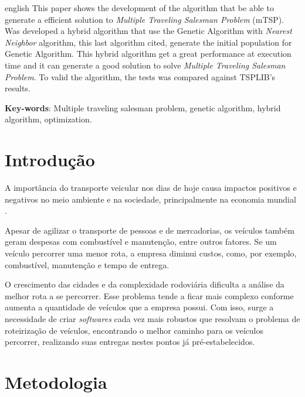 \documentclass[12pt,openright,a4paper,twoside]{tcc}
\begin{document}
	\begin{resumo}[Abstract]
    	\begin{otherlanguage*}{english}
		This paper shows the development of the algorithm that be able to generate a efficient solution to \textit{Multiple Traveling Salesman Problem} (mTSP). Was developed a hybrid algorithm that use the Genetic Algorithm with \textit{Nearest Neighbor} algorithm, this last algorithm cited, generate the initial population for Genetic Algorithm. This hybrid algorithm get a great performance at execution time and it can generate a good solution to solve \textit{Multiple Traveling Salesman Problem}. To valid the algorithm, the tests was compared against TSPLIB's results.

        \vspace{\onelineskip}
        \noindent
        \textbf{Key-words}: Multiple traveling salesman problem, genetic algorithm,  hybrid algorithm, optimization.
		\end{otherlanguage*}
	\end{resumo}
	

	\chapter{Introdução}
		
		A importância do transporte veicular nos dias de hoje causa impactos positivos e negativos 
	    no meio ambiente e na sociedade, principalmente na economia mundial \cite{meioAmbiente}. 
		
		Apesar de agilizar o transporte de pessoas e  de mercadorias, 
		os veículos também geram despesas com combustível e manutenção, entre outros fatores. 
		Se um veículo percorrer uma menor rota, a empresa diminui custos, como, por exemplo, 
		combustível, manutenção e tempo de entrega.

		O crescimento das cidades e da complexidade rodoviária dificulta a análise da melhor rota a se percorrer. Esse problema tende a ficar mais complexo conforme aumenta a quantidade de veículos que a empresa possui. Com isso, surge a necessidade de criar 
		\textit{softwares} cada vez mais robustos que resolvam o problema de roteirização de veículos, encontrando o melhor caminho para os veículos percorrer, realizando suas entregas nestes pontos já pré-estabelecidos.


	\chapter{Metodologia}
\end{document}

